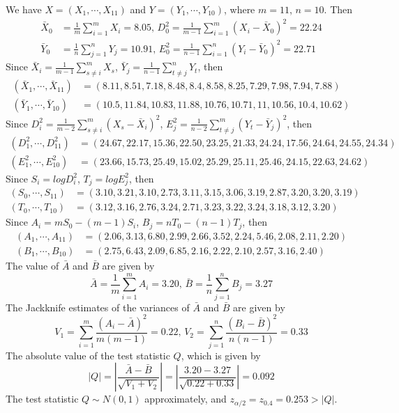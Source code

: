 \documentclass[12pt,a4paper]{article}
\begin{document}
We have $X=(X_{1},\cdots,X_{11})$ and $Y=(Y_{1},\cdots,Y_{10})$, where $m=11$, $n=10$. Then
\begin{align*}
\bar{X}_{0}&=\frac{1}{m}\sum_{i=1}^{m}X_{i}=8.05 \text{, } D_{0}^{2}=\frac{1}{m-1}\sum_{i=1}^{m}(X_{i}-\bar{X}_{0})^{2}=22.24\\
\bar{Y}_{0}&=\frac{1}{n}\sum_{j=1}^{n}Y_{j}=10.91 \text{, } E_{0}^{2}=\frac{1}{n-1}\sum_{i=1}^{n}(Y_{i}-\bar{Y}_{0})^{2}=22.71
\end{align*} 
Since $\bar{X}_{i}=\frac{1}{m-1}\sum_{s\neq i}^{m}X_{s}$, $\bar{Y}_{j}=\frac{1}{n-1}\sum_{t\neq j}^{n}Y_{t}$, then
\begin{align*}
(\bar{X}_{1},\cdots,\bar{X}_{11})&=(8.11,8.51,7.18,8.48,8.4,8.58,8.25,7.29,7.98,7.94,7.88)\\
(\bar{Y}_{1},\cdots,\bar{Y}_{10})&=(10.5,11.84,10.83,11.88,10.76,10.71,11,10.56,10.4,10.62)
\end{align*}
Since $D_{i}^{2}=\frac{1}{m-2}\sum_{s\neq i}^{m}(X_{s}-\bar{X}_{i})^{2}$, $E_{j}^{2}=\frac{1}{n-2}\sum_{t\neq j}^{m}(Y_{t}-\bar{Y}_{j})^{2}$, then
\begin{align*}
(D_{1}^{2},\cdots,D_{11}^{2})&=(24.67,22.17,15.36,22.50,23.25,21.33,24.24,17.56,24.64,24.55,24.34)\\
(E_{1}^{2},\cdots,E_{10}^{2})&=(23.66,15.73,25.49,15.02,25.29,25.11,25.46,24.15,22.63,24.62)
\end{align*}
Since $S_{i}=logD_{i}^{2}$, $T_{j}=logE_{j}^{2}$, then
\begin{align*}
(S_{0},\cdots,S_{11})&=(3.10,3.21,3.10,2.73,3.11,3.15,3.06,3.19,2.87,3.20,3.20,3.19)\\
(T_{0},\cdots,T_{10})&=(3.12,3.16,2.76,3.24,2.71,3.23,3.22,3.24,3.18,3.12,3.20)
\end{align*}
Since $A_{i}=mS_{0}-(m-1)S_{i}$, $B_{j}=nT_{0}-(n-1)T_{j}$, then
\begin{align*}
(A_{1},\cdots,A_{11})&=(2.06,3.13,6.80,2.99,2.66,3.52,2.24,5.46,2.08,2.11,2.20)\\
(B_{1},\cdots,B_{10})&=(2.75,6.43,2.09,6.85,2.16,2.22,2.10,2.57,3.16,2.40)
\end{align*}
The value of $\bar{A}$ and $\bar{B}$ are given by $$\bar{A}=\frac{1}{m}\sum_{i=1}^{m}A_{i}=3.20 \text{, } \bar{B}=\frac{1}{n}\sum_{j=1}^{n}B_{j}=3.27$$
The Jackknife estimates of the variances of $\bar{A}$ and $\bar{B}$ are given by $$V_{1}=\sum_{i=1}^{m}\frac{(A_{i}-\bar{A})^{2}}{m(m-1)}=0.22 \text{, } V_{2}=\sum_{j=1}^{n}\frac{(B_{i}-\bar{B})^{2}}{n(n-1)}=0.33$$
The absolute value of the test statistic $Q$, which is given by
$$|Q|=\left|\frac{\bar{A}-\bar{B}}{\sqrt{V_{1}+V_{2}}}\right|=\left|\frac{3.20-3.27}{\sqrt{0.22+0.33}}\right|=0.092$$
The test statistic $Q\sim N(0,1)$ approximately, and $z_{\alpha/2}=z_{0.4}=0.253>|Q|$. 
\end{document}
